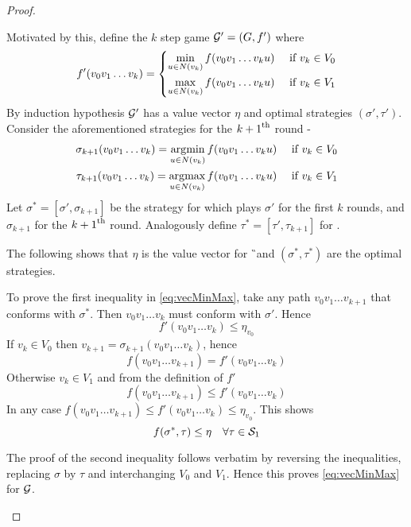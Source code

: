 \begin{proof}
\begin{description}
        Motivated by this, define the $k$ step game $\G'=(G,f')$ where
            \[
                f'(v_0v_1 \ldots v_k) = \begin{dcases}
                    \min_{ u \in N(v_k) } f(v_0 v_1 \ldots v_k u) & \tif v_k \in V_0\\
                    \max_{ u \in N(v_k) } f(v_0 v_1 \ldots v_k u) & \tif v_k \in V_1
                \end{dcases}
            \]
            By induction hypothesis $\G'$ has a value vector $\eta$ and optimal strategies $(\sigma',\tau')$.
            Consider the aforementioned strategies for the $\nth[k+1]$ round -
            \begin{align*}
                \sigma_{k+1}(v_0 v_1 \ldots v_k) = \argmin_{ u \in N(v_k) } f(v_0 v_1 \ldots v_k u) \quad \tif v_k \in V_0 \\
                \tau_{k+1}(v_0 v_1 \ldots v_k) = \argmax_{ u \in N(v_k) } f(v_0 v_1 \ldots v_k u) \quad \tif v_k \in V_1
            \end{align*}
            Let $\sigma^*=[\sigma',\sigma_{k+1}]$ be the strategy for  which plays $\sigma'$ for the first $k$ rounds, and $\sigma_{k+1}$ for the $\nth[k+1]$ round. Analogously define $\tau^*=[\tau',\tau_{k+1}]$ for .

            The following shows that $\eta$ is the value vector for \G\ and $(\sigma^*,\tau^*)$ are the optimal strategies.

            To prove the first inequality in \eqref{eq:vecMinMax}, take any path $v_0v_1 \ldots v_{k+1}$ that conforms with $\sigma^*$. Then $v_0v_1 \ldots v_k$ must conform with $\sigma'$. Hence
            \[
                f'(v_0 v_1 \ldots v_k) \leq \eta_{v_0}
            \]
            If $v_k \in V_0$ then $v_{k+1}=\sigma_{k+1}(v_0 v_1 \ldots v_k)$, hence
            \[
                f(v_0v_1 \ldots v_{k+1}) = f'(v_0v_1 \ldots v_k)
            \]
            Otherwise $v_k \in V_1$ and from the definition of $f'$
            \[
                f(v_0v_1 \ldots v_{k+1}) \leq f'(v_0v_1 \ldots v_k)
            \]
            In any case $f(v_0 v_1 \ldots v_{k+1}) \leq f'(v_0 v_1 \ldots v_k) \leq \eta_{v_0}$. This shows
            \[
                f(\sigma^*,\tau) \leq \eta \quad \forall \tau \in \ST{1}
            \]

            The proof of the second inequality follows verbatim by reversing the inequalities, replacing $\sigma$ by $\tau$ and interchanging $V_0$ and $V_1$. Hence this proves \eqref{eq:vecMinMax} for $\G$.
    \end{description}
\end{proof}
